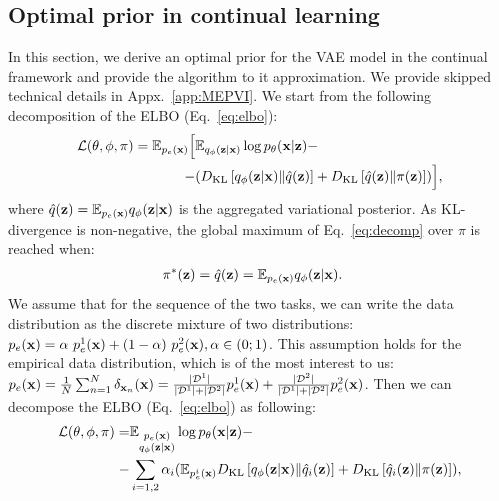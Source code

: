 \subsection{Optimal prior in continual learning} \label{sec:opt_prior}
In this section, we derive an optimal prior for the VAE model in the continual framework and provide the algorithm to it approximation. We provide skipped technical details in Appx.~\ref{app:MEPVI}. We start from the following decomposition of the ELBO (Eq.~\ref{eq:elbo}):
\begin{equation}
\label{eq:decomp}
\begin{aligned}
  \mathcal{L}(\theta, \phi, \pi) = \E_{p_{e}(\rvx)}\Big[&\E_{q_{\phi}(\rvz|\rvx)}\log p_{\theta}(\rvx|\rvz) - \\
  - &(\KL{q_{\phi}(\rvz|\rvx)}{\hat{q}(\rvz)}+ \KL{\hat{q}(\rvz)}{\pi(\rvz)})\Big],
\end{aligned}
\end{equation}
where $\hat{q}({\mathbf{z}})=\mathbb{E}_{p_{e}({\mathbf{x}})}q_{\phi}({\mathbf{z}}|{\mathbf{x}})$ is the aggregated variational posterior. As KL-divergence is non-negative, the global maximum of Eq.~\ref{eq:decomp} over $\pi$ is reached when:
\begin{equation}
\label{eq:opt_pr}
    \begin{aligned}
    & \pi^{*}(\rvz) = \hat{q}(\rvz)=\E_{p_{e}(\rvx)}q_{\phi}(\rvz|\rvx).
    \end{aligned}
\end{equation}
We assume that for the sequence of the two tasks, we can write the data distribution as the discrete mixture of two distributions: $p_{e}({\mathbf{x}})=\alpha~p_{e}^{1}({\mathbf{x}})+(1-\alpha)~p_{e}^{2}({\mathbf{x}}), \alpha\in(0;1)$. This assumption holds for the empirical data distribution, which is of the most interest to us: $p_{e}({\mathbf{x}})=\tfrac{1}{N}\sum_{n=1}^{N}\delta_{{\mathbf{x}}_n}({\mathbf{x}}) = \tfrac{|\mathcal{D}^1|}{|\mathcal{D}^1|+|\mathcal{D}^2|}p^{1}_{e}({\mathbf{x}}) + \tfrac{|\mathcal{D}^2|}{|\mathcal{D}^1|+|\mathcal{D}^2|}p^{2}_{e}({\mathbf{x}})$. 
Then we can decompose the ELBO (Eq.~\ref{eq:elbo}) as following:
\begin{equation}
\label{eq:big_decimpose}
\begin{aligned}
 \mathcal{L}(\theta, \phi, \pi) = & \E_{\substack{p_{e}(\rvx)\\
q_{\phi}(\rvz|\rvx)}}\log p_{\theta}(\rvx|\rvz) - \\
- &\sum\limits_{i=1,2}\alpha_i( \E_{p^i_{e}(\rvx)} \KL{q_{\phi}(\rvz|\rvx)}{\hat{q}_{i}(\rvz)}+ \KL{\hat{q}_{i}(\rvz)}{\pi(\rvz)}), 
\end{aligned}
\end{equation}
